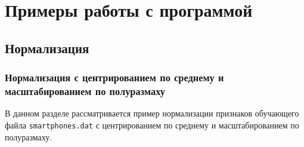 \documentclass[12pt,twoside,a4paper,tikz,border=5]{refart}
\begin{document}
\section{Примеры работы с программой}
\subsection{Нормализация}
\subsubsection{Нормализация с центрированием по среднему и масштабированием по полуразмаху}
\label{subsubseq:example_norm1}

В данном разделе рассматривается пример нормализации признаков обучающего файла \texttt{smartphones.dat} с центрированием по среднему и масштабированием по полуразмаху. 
\end{document}
